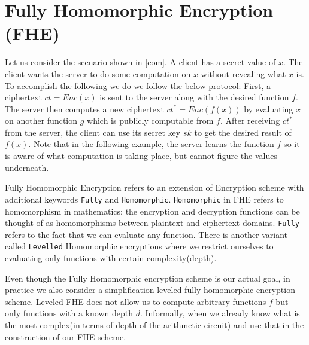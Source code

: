 \documentclass[usletter]{article}
\begin{document}
\section{Fully Homomorphic Encryption (FHE)}

Let us consider the scenario shown in \ref{com}. A client has a secret value of $x$. The client wants the server to do some computation on $x$ without revealing what $x$ is. To accomplish the following we do we follow the below protocol: First, a ciphertext $ct=Enc(x)$ is sent to the server along with the desired function $f$. The server then computes a new ciphertext $ct^*=Enc(f(x))$ by evaluating $x$ on another function $g$ which is publicly computable from $f$. After receiving $ct^*$ from the server, the client can use its secret key $sk$ to get the desired result of $f(x)$. Note that in the following example, the server learns the function $f$ so it is aware of what computation is taking place, but cannot figure the values underneath. 

Fully Homomorphic Encryption\cite{wu2015fully} refers to an extension of Encryption scheme with additional keywords \texttt{Fully} and \texttt{Homomorphic}.
\texttt{Homomorphic} in FHE refers to homomorphism in mathematics: the encryption and decryption functions can be thought of as homomorphisms between plaintext and ciphertext domains. \texttt{Fully} refers to the fact that we can evaluate any function. There is another variant called \texttt{Levelled} Homomorphic encryptions where we restrict ourselves to evaluating only functions with certain complexity(depth). 

Even though the Fully Homomorphic encryption scheme is our actual goal, in practice we also consider a simplification leveled fully homomorphic encryption scheme. Leveled FHE does not allow us to compute arbitrary functions $f$ but only functions with a known depth $d$. Informally, when we already know what is the most complex(in terms of depth of the arithmetic circuit) and use that in the construction of our FHE scheme.
\end{document}
